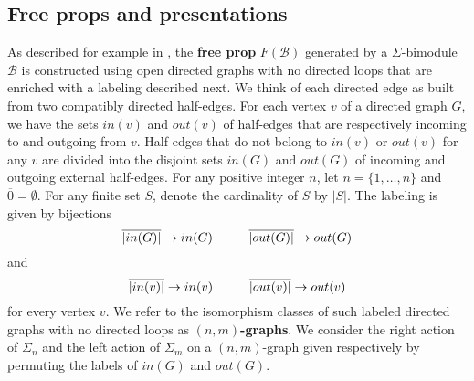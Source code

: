 \documentclass{amsart}
\newcommand{\B}{\mathcal{B}}
\renewcommand{\1}{\mathbf{1}}
\theoremstyle{definition}
\begin{document}
\subsection{Free props and presentations}	As described for example in \cite{fresse2010props}, the \textbf{free prop} $F(\B)$ generated by a \mbox{$\Sigma$-bimodule} $\B$ is constructed using open directed graphs with no directed loops that are enriched with a labeling described next. We think of each directed edge as built from two compatibly directed half-edges. For each vertex $v$ of a directed graph $G$, we have the sets $in(v)$ and $out(v)$ of half-edges that are respectively incoming to and outgoing from $v$. Half-edges that do not belong to $in(v)$ or $out(v)$ for any $v$ are divided into the disjoint sets $in(G)$ and $out(G)$ of incoming and outgoing external half-edges. For any positive integer $n$, let $\overline{n} = \{1,\dots,n\}$ and $\overline{0} = \emptyset$. For any finite set $S$, denote the cardinality of $S$ by $|S|$. The labeling is given by bijections  
\begin{equation*}
\overline{|in(G)|}\to in(G)\hspace*{1cm}\overline{|out(G)|}\to out(G)
\end{equation*}
and
\begin{equation*}
\overline{|in(v)|}\to in(v)\hspace*{1cm}\overline{|out(v)|}\to out(v)
\end{equation*}
for every vertex $v$. We refer to the isomorphism classes of such labeled directed graphs with no directed loops as $(n,m)$\textbf{-graphs}. We consider the right action of $\Sigma_n$ and the left action of $\Sigma_m$ on a $(n,m)$-graph given respectively by permuting the labels of $in(G)$ and $out(G)$. 
\end{document}
